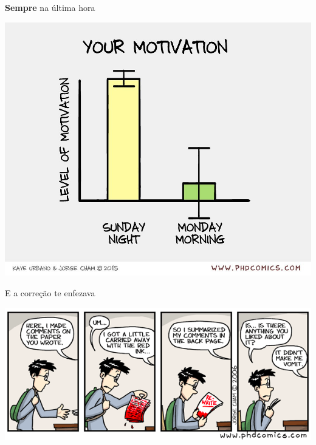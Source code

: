 \documentclass{beamer}
\begin{document}
\begin{frame}{{\bf Sempre} na última hora}
  \begin{center}
    \includegraphics[height=.75\textheight]{Encerramento/phdcomics-motivation}

    \vfill
  \end{center}
\end{frame}

\begin{frame}{E a correção te enfezava}
  \begin{center}
    \includegraphics[width=\textwidth]{Encerramento/phdcomics-correcao}

    \vfill
  \end{center}
\end{frame}
\end{document}
